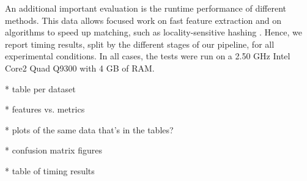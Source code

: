 An additional important evaluation is the runtime performance of different methods.
This data allows focused work on fast feature extraction and on algorithms to speed up matching, such as locality-sensitive hashing \cite{Frome2004}.
Hence, we report timing results, split by the different stages of our pipeline, for all experimental conditions.
In all cases, the tests were run on a 2.50 GHz Intel Core2 Quad Q9300 with 4 GB of RAM.

* table per dataset

* features vs. metrics

* plots of the same data that's in the tables?

* confusion matrix figures

* table of timing results

